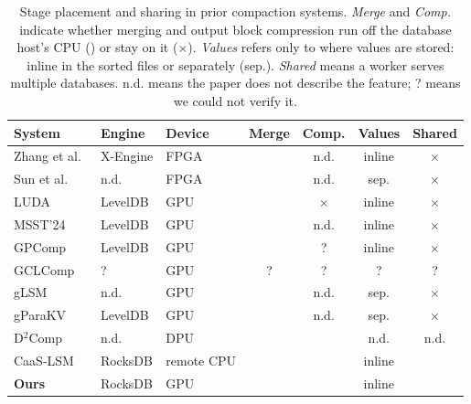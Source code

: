 \documentclass[sigconf, nonacm]{acmart}
\newcommand{\yes}{\checkmark}
\newcommand{\no}{$\times$}
\newcommand{\nd}{n.d.}
\newcommand{\unverified}{?}
\begin{document}
\begin{table}[t]
  \centering
  \footnotesize
  \setlength{\tabcolsep}{2.5pt}
  \caption{Stage placement and sharing in prior compaction systems. \emph{Merge} and
  \emph{Comp.} indicate whether merging and output block compression run off the
  database host's CPU (\yes) or stay on it (\no). \emph{Values} refers only to where
  values are stored: inline in the sorted files or separately (sep.).
  \emph{Shared} means a worker serves multiple databases. \nd{} means the paper
  does not describe the feature; \unverified{} means we could not verify it.}
  \label{tab:related}
  \begin{tabular}{@{}lllcccc@{}}
    \toprule
    System & Engine & Device & Merge & Comp. & Values & Shared \\
    \midrule
    Zhang et al.~\cite{fpga2020}      & X-Engine & FPGA        & \yes & \nd  & inline        & \no \\
    Sun et al.~\cite{fpgacompaction2020} & \nd & FPGA       & \yes & \nd  & sep.        & \no \\
    LUDA~\cite{luda2020}              & LevelDB  & GPU         & \yes & \no  & inline      & \no \\
    MSST'24~\cite{zhou2024msst}       & LevelDB  & GPU         & \yes & \nd  & inline      & \no \\
    GPComp~\cite{gpcomp2025}          & LevelDB  & GPU         & \yes & \unverified & inline & \no \\
    GCLComp~\cite{gclcomp2025}        & \unverified & GPU      & \unverified & \unverified & \unverified & \unverified \\
    gLSM~\cite{glsm2024}              & \nd     & GPU         & \yes & \nd  & sep.        & \no \\
    gParaKV~\cite{gparakv2025}        & LevelDB  & GPU         & \yes & \nd  & sep.        & \no \\
    D$^2$Comp~\cite{d2comp2024}       & \nd     & DPU         & \yes & \yes & \nd         & \nd \\
    CaaS-LSM~\cite{caaslsm2024}       & RocksDB  & remote CPU & \yes & \yes & inline      & \yes \\
    \textbf{Ours}                     & RocksDB  & GPU         & \yes & \yes & inline      & \yes \\
    \bottomrule
  \end{tabular}
\end{table}
\end{document}
